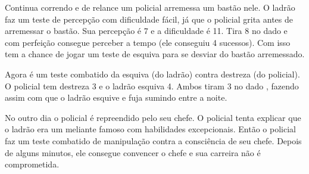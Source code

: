 Continua correndo e de relance um policial arremessa um bastão nele. O ladrão faz um teste de percepção com dificuldade fácil, já que o policial grita antes de arremessar o bastão. Sua percepção é 7 e a dificuldade é 11. Tira 8 no dado e com perfeição consegue perceber a tempo (ele conseguiu 4 sucessos). Com isso tem a chance de jogar um teste de esquiva para se desviar do bastão arremessado.

Agora é um teste combatido da esquiva (do ladrão) contra destreza (do policial). O policial tem destreza 3 e o ladrão esquiva 4. Ambos tiram 3 no dado , fazendo assim com que o ladrão esquive e fuja sumindo entre a noite.

No outro dia o policial é repreendido pelo seu chefe. O policial tenta explicar que o ladrão era um meliante famoso com habilidades excepcionais. Então o policial faz um teste combatido de manipulação contra a consciência de seu chefe. Depois de alguns minutos, ele consegue convencer o chefe e sua carreira não é comprometida.
